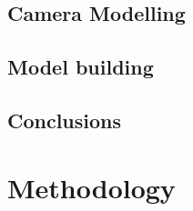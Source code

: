 \documentclass[12pt]{article}
\begin{document}
\subsection{Camera Modelling}

\subsection{Model building}


\subsection{Conclusions}

\section{Methodology} 







\end{document}
